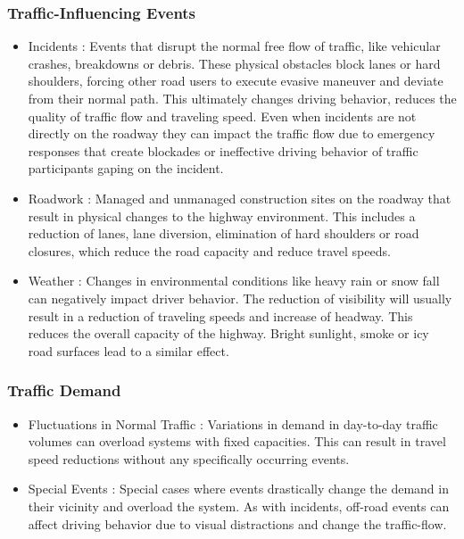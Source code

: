 \subsubsection{Traffic-Influencing Events}

\begin{itemize}
	\item Incidents : Events that disrupt the normal free flow of traffic, like vehicular crashes, breakdowns or debris. These physical obstacles block lanes or hard shoulders, forcing other road users to execute evasive maneuver and deviate from their normal path. This ultimately changes driving behavior, reduces the quality of traffic flow and traveling speed. Even when incidents are not directly on the roadway they can impact the traffic flow due to emergency responses that create blockades or ineffective driving behavior of traffic participants gaping on the incident.
	\item Roadwork : Managed and unmanaged construction sites on the roadway that result in physical changes to the highway environment. This includes a reduction of lanes, lane diversion, elimination of hard shoulders or road closures, which reduce the road capacity and reduce travel speeds.
	\item Weather : Changes in environmental conditions like heavy rain or snow fall can negatively impact driver behavior. The reduction of visibility will usually result in a reduction of traveling speeds and increase of headway. This reduces the overall capacity of the highway. Bright sunlight, smoke or icy road surfaces lead to a similar effect.
\end{itemize}

\subsubsection{Traffic Demand}

\begin{itemize}
	\item Fluctuations in Normal Traffic : Variations in demand in day-to-day traffic volumes can overload systems with fixed capacities. This can result in travel speed reductions without any specifically occurring events.
	\item Special Events : Special cases where events drastically change the demand in their vicinity and overload the system. As with incidents, off-road events can affect driving behavior due to visual distractions and change the traffic-flow. 
\end{itemize}

